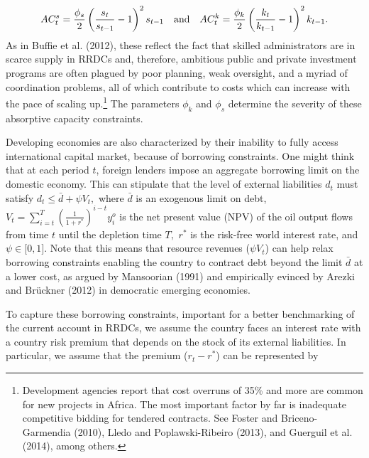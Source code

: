 \documentclass[11pt]{article}
\begin{document}
\begin{equation}
AC_{t}^{s}=\frac{\phi _{s}}{2}\left( \frac{s_{t}}{s_{t-1}}-1\right)
^{2}s_{t-1}\text{ \ \ and \ \ }AC_{t}^{k}=\frac{\phi _{k}}{2}\left( \frac{%
k_{t}}{k_{t-1}}-1\right) ^{2}k_{t-1}.  \label{AC}
\end{equation}%
As in Buffie et al. (2012), these reflect the fact that skilled
administrators are in scarce supply in RRDCs and, therefore, ambitious
public and private investment programs are often plagued by poor planning,
weak oversight, and a myriad of coordination problems, all of which
contribute to costs which can increase with the pace of scaling up.\footnote{%
Development agencies report that cost overruns of 35\% and more are common
for new projects in Africa. The most important factor by far is inadequate
competitive bidding for tendered contracts. See Foster and Briceno-Garmendia
(2010), Lledo and Poplawski-Ribeiro (2013), and Guerguil et al. (2014),
among others.} The parameters $\phi _{k}$ and $\phi _{s}$ determine the
severity of these absorptive capacity constraints.

Developing economies are also characterized by their inability to fully
access international capital market, because of borrowing constraints. One
might think that at each period $t$, foreign lenders impose an aggregate
borrowing limit on the domestic economy. This can stipulate that the level
of external liabilities $d_{t}$ must satisfy $d_{t}\leq \bar{d}+\psi V_{t},$
where $\bar{d}$ is an exogenous limit on debt, $V_{t}=\sum_{i=t}^{T}\left( 
\frac{1}{1+r^{\ast }}\right) ^{i-t}y_{i}^{o}$ is the net present value (NPV)
of the oil output flows from time $t$ until the depletion time $T,$ $r^{\ast
}$ is the risk-free world interest rate, and $\psi \in \lbrack 0,1]$. Note
that this means that resource revenues ($\psi V_{t}$) can help relax
borrowing constraints enabling the country to contract debt beyond the limit 
$\bar{d}$ at a lower cost, as argued by Mansoorian (1991) and empirically
evinced by Arezki and Br\"{u}ckner (2012) in democratic emerging economies.

To capture these borrowing constraints, important for a better benchmarking
of the current account in RRDCs, we assume the country faces an interest
rate with a country risk premium that depends on the stock of its external
liabilities. In particular, we assume that the premium ($r_{t}-r^{\ast }$)
can be represented by
\end{document}
